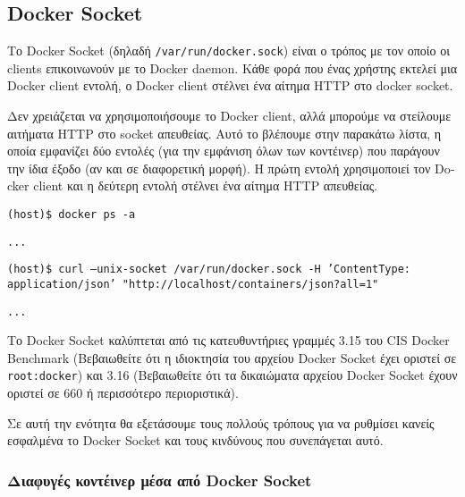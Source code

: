 \subsection{\textlatin{Docker Socket}}

Το \textlatin{Docker Socket} (δηλαδή \texttt{\textlatin{/var/run/docker.sock}})
είναι ο τρόπος με τον οποίο οι \textlatin{clients} επικοινωνούν με το
\textlatin{Docker daemon}. Κάθε φορά που ένας χρήστης εκτελεί μια
\textlatin{Docker client} εντολή, ο \textlatin{Docker client} στέλνει ένα
αίτημα \textlatin{HTTP} στο \textlatin{docker socket}.

Δεν χρειάζεται να χρησιμοποιήσουμε το \textlatin{Docker client}, αλλά μπορούμε
να στείλουμε αιτήματα \textlatin{HTTP} στο \textlatin{socket} απευθείας. Αυτό
το βλέπουμε στην παρακάτω λίστα, η οποία εμφανίζει δύο εντολές
(για την εμφάνιση όλων των κοντέινερ) που παράγουν την ίδια έξοδο (αν και σε
διαφορετική μορφή). Η πρώτη εντολή χρησιμοποιεί τον \textlatin{Docker client}
και η δεύτερη εντολή στέλνει ένα αίτημα \textlatin{HTTP} απευθείας.

\texttt{\textlatin{(host)\$ docker ps -a}}

\texttt{\textlatin{...}}

\texttt{\textlatin{(host)\$ curl --unix-socket /var/run/docker.sock -H 'ContentType: application/json' "http://localhost/containers/json?all=1"}}

\texttt{\textlatin{...}}

Το \textlatin{Docker Socket} καλύπτεται από τις κατευθυντήριες γραμμές 3.15 του
\textlatin{CIS Docker Benchmark}
(Βεβαιωθείτε ότι η ιδιοκτησία του αρχείου \textlatin{Docker Socket} έχει
οριστεί σε \texttt{\textlatin{root:docker}}) και 3.16 (Βεβαιωθείτε ότι τα
δικαιώματα αρχείου \textlatin{Docker Socket} έχουν οριστεί σε 660 ή περισσότερο
περιοριστικά).

Σε αυτή την ενότητα θα εξετάσουμε τους πολλούς τρόπους για να ρυθμίσει κανείς
εσφαλμένα το \textlatin{Docker Socket} και τους κινδύνους
\cite{The-Dangers-Of-Docker-Sock} που συνεπάγεται αυτό.

\subsubsection{Διαφυγές κοντέινερ μέσα από \textlatin{Docker Socket}}

